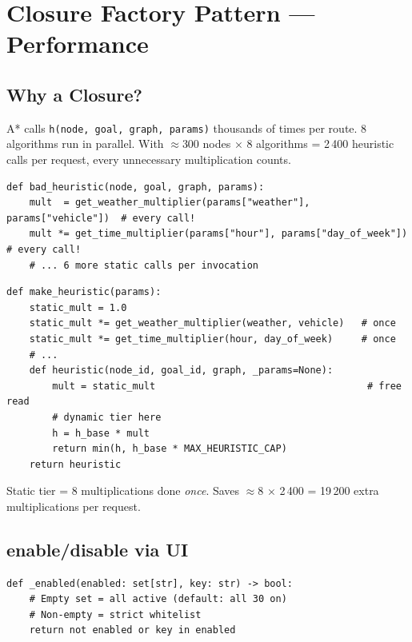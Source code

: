 \documentclass[11pt,a4paper]{article}
\begin{document}
\section{Closure Factory Pattern — Performance}

\subsection{Why a Closure?}

A* calls \texttt{h(node, goal, graph, params)} thousands of times per route. 8 algorithms run in parallel.
With $\approx$300 nodes × 8 algorithms = 2\,400 heuristic calls per request, every unnecessary multiplication counts.

\begin{lstlisting}[caption={Without closure — SLOW (recomputes static tier every call)}]
def bad_heuristic(node, goal, graph, params):
    mult  = get_weather_multiplier(params["weather"], params["vehicle"])  # every call!
    mult *= get_time_multiplier(params["hour"], params["day_of_week"])     # every call!
    # ... 6 more static calls per invocation
\end{lstlisting}

\begin{lstlisting}[caption={With closure — FAST (static tier baked in)}]
def make_heuristic(params):
    static_mult = 1.0
    static_mult *= get_weather_multiplier(weather, vehicle)   # once
    static_mult *= get_time_multiplier(hour, day_of_week)     # once
    # ...
    def heuristic(node_id, goal_id, graph, _params=None):
        mult = static_mult                                     # free read
        # dynamic tier here
        h = h_base * mult
        return min(h, h_base * MAX_HEURISTIC_CAP)
    return heuristic
\end{lstlisting}

Static tier = 8 multiplications done \textit{once}. Saves $\approx$8 × 2\,400 = 19\,200 extra multiplications per request.

\subsection{enable/disable via UI}

\begin{lstlisting}[caption={combined.py — _enabled() helper}]
def _enabled(enabled: set[str], key: str) -> bool:
    # Empty set = all active (default: all 30 on)
    # Non-empty = strict whitelist
    return not enabled or key in enabled
\end{lstlisting}
\end{document}
